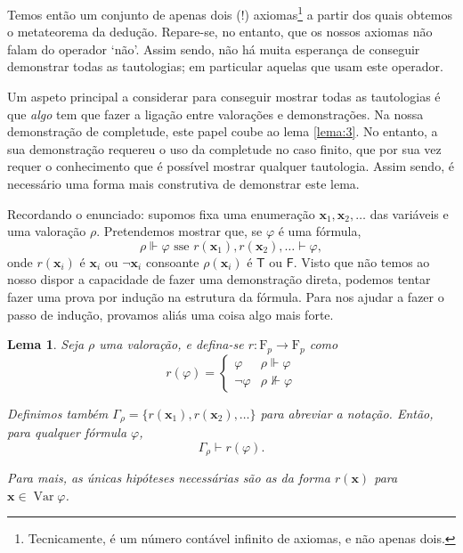 \documentclass{report}
\newtheorem{lema}{Lema}
\theoremstyle{definition}
\theoremstyle{remark}
\renewcommand{\bf}[1]{\mathbf{#1}}
\newcommand{\F}{\mathrm{F}}
\newcommand{\lt}{\mathsf{T}}
\newcommand{\lf}{\mathsf{F}}
\DeclareMathOperator{\var}{Var}
\begin{document}
	Temos então um conjunto de apenas dois (!) axiomas\footnote{Tecnicamente, é um número contável infinito de axiomas, e não apenas dois.} a partir dos quais obtemos o metateorema da dedução. Repare-se, no entanto, que os nossos axiomas não falam do operador `não'. Assim sendo, não há muita esperança de conseguir demonstrar todas as tautologias; em particular aquelas que usam este operador.
	
	Um aspeto principal a considerar para conseguir mostrar todas as tautologias é que \emph{algo} tem que fazer a ligação entre valorações e demonstrações. Na nossa demonstração de completude, este papel coube ao lema \ref{lema:3}. No entanto, a sua demonstração requereu o uso da completude no caso finito, que por sua vez requer o conhecimento que é possível mostrar qualquer tautologia. Assim sendo, é necessário uma forma mais construtiva de demonstrar este lema.
	
	Recordando o enunciado: supomos fixa uma enumeração $\bf x_1, \bf x_2, \dots$ das variáveis e uma valoração $\rho$. Pretendemos mostrar que, se $\varphi$ é uma fórmula,
	\[\rho \Vdash \varphi \text{ sse } r(\bf x_1), r(\bf x_2), \dots \vdash \varphi,\]
	onde $r(\bf x_i)$ é $\bf x_i$ ou $\neg \bf x_i$ consoante $\rho(\bf x_i)$ é $\lt$ ou $\lf$. Visto que não temos ao nosso dispor a capacidade de fazer uma demonstração direta, podemos tentar fazer uma prova por indução na estrutura da fórmula. Para nos ajudar a fazer o passo de indução, provamos aliás uma coisa algo mais forte.
	
	\begin{lema}\label{ligacao:rho:vdash}
	Seja $\rho$ uma valoração, e defina-se $r : \F_p \to \F_p$ como 
	\[r(\varphi) =
	\begin{cases}
	\varphi&\rho\Vdash\varphi\\
	\neg\varphi&\rho\nVdash\varphi
	\end{cases}
	\]
	
	Definimos também $\Gamma_\rho = \{r(\bf x_1), r(\bf x_2), \dots\}$ para abreviar a notação. Então, para qualquer fórmula $\varphi$,
	\[\Gamma_\rho \vdash r(\varphi).\]
	
	Para mais, as únicas hipóteses necessárias são as da forma $r(\bf x)$ para $\bf x \in \var \varphi$.
	\end{lema}
	
\end{document}
